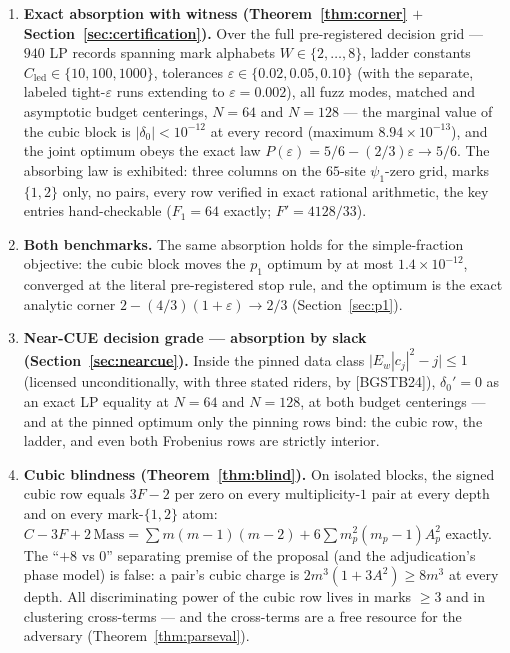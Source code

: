 \documentclass[11pt]{article}
\theoremstyle{plain}
\theoremstyle{definition}
\theoremstyle{remark}
\newcommand{\Cled}{C_{\mathrm{led}}}
\begin{document}
\begin{enumerate}
\item \textbf{Exact absorption with witness (Theorem~\ref{thm:corner} $+$
Section~\ref{sec:certification}).} Over the full pre-registered decision grid ---
$940$ LP records spanning mark alphabets $W \in \{2, \ldots, 8\}$, ladder
constants $\Cled \in \{10, 100, 1000\}$, tolerances
$\varepsilon \in \{0.02, 0.05, 0.10\}$ (with the separate, labeled tight-$\varepsilon$
runs extending to $\varepsilon = 0.002$), all fuzz modes, matched and asymptotic
budget centerings, $N = 64$ and $N = 128$ --- the marginal value of the cubic
block is $|\delta_0| < 10^{-12}$ at every record (maximum
$8.94 \times 10^{-13}$), and the joint optimum obeys the exact law
$P(\varepsilon) = 5/6 - (2/3)\varepsilon \to 5/6$. The absorbing law is
exhibited: three columns on the $65$-site $\psi_1$-zero grid, marks $\{1, 2\}$
only, no pairs, every row verified in exact rational arithmetic, the key entries
hand-checkable ($F_1 = 64$ exactly; $F' = 4128/33$).

\item \textbf{Both benchmarks.} The same absorption holds for the
simple-fraction objective: the cubic block moves the $p_1$ optimum by at most
$1.4 \times 10^{-12}$, converged at the literal pre-registered stop rule, and the
optimum is the exact analytic corner
$2 - (4/3)(1 + \varepsilon) \to 2/3$ (Section~\ref{sec:p1}).

\item \textbf{Near-CUE decision grade --- absorption by slack
(Section~\ref{sec:nearcue}).} Inside the pinned data class
$\bigl| E_w |c_j|^2 - j \bigr| \le 1$ (licensed unconditionally, with three
stated riders, by [BGSTB24]), $\delta_0' = 0$ as an exact LP equality at
$N = 64$ and $N = 128$, at both budget centerings --- and at the pinned optimum
only the pinning rows bind: the cubic row, the ladder, and even both Frobenius
rows are strictly interior.

\item \textbf{Cubic blindness (Theorem~\ref{thm:blind}).} On isolated blocks,
the signed cubic row equals $3F - 2$ per zero on every multiplicity-$1$ pair at
every depth and on every mark-$\{1, 2\}$ atom:
$C - 3F + 2\,\mathrm{Mass} = \sum m(m-1)(m-2) + 6 \sum m_p^2 (m_p - 1) A_p^2$
exactly. The ``$+8$ vs $0$'' separating premise of the proposal (and the
adjudication's phase model) is false: a pair's cubic charge is
$2m^3(1 + 3A^2) \ge 8m^3$ at every depth. All discriminating power of the cubic
row lives in marks $\ge 3$ and in clustering cross-terms --- and the cross-terms
are a free resource for the adversary (Theorem~\ref{thm:parseval}).


\end{enumerate}
\end{document}
